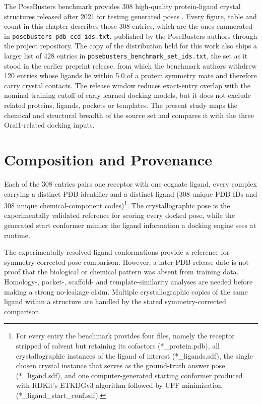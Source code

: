 The PoseBusters benchmark provides 308 high-quality protein-ligand crystal structures released after 2021 for testing generated poses \cite{ref035}. Every figure, table and count in this chapter describes those 308 entries, which are the ones enumerated in \texttt{posebusters\_pdb\_ccd\_ids.txt}, published by the PoseBusters authors through the project repository. The copy of the distribution held for this work also ships a larger list of 428 entries in \texttt{posebusters\_benchmark\_set\_ids.txt}, the set as it stood in the earlier preprint release, from which the benchmark authors withdrew 120 entries whose ligands lie within 5.0 \angstrom{} of a protein symmetry mate and therefore carry crystal contacts. The release window reduces exact-entry overlap with the nominal training cutoff of early learned docking models, but it does not exclude related proteins, ligands, pockets or templates. The present study maps the chemical and structural breadth of the source set and compares it with the three Orai1-related docking inputs.

\hypertarget{composition-and-provenance}{%
\section{Composition and Provenance}\label{composition-and-provenance}}

Each of the 308 entries pairs one receptor with one cognate ligand, every complex carrying a distinct PDB identifier and a distinct ligand (308 unique PDB IDs and 308 unique chemical-component codes)\footnote{For every entry the benchmark provides four files, namely the receptor stripped of solvent but retaining its cofactors (*\_protein.pdb), all crystallographic instances of the ligand of interest (*\_ligands.sdf), the single chosen crystal instance that serves as the ground-truth answer pose (*\_ligand.sdf), and one computer-generated starting conformer produced with RDKit's ETKDGv3 algorithm followed by UFF minimisation (*\_ligand\_start\_conf.sdf).}. The crystallographic pose is the experimentally validated reference for scoring every docked pose, while the generated start conformer mimics the ligand information a docking engine sees at runtime.

The experimentally resolved ligand conformations provide a reference for symmetry-corrected pose comparison. However, a later PDB release date is not proof that the biological or chemical pattern was absent from training data. Homology-, pocket-, scaffold- and template-similarity analyses are needed before making a strong no-leakage claim. Multiple crystallographic copies of the same ligand within a structure are handled by the stated symmetry-corrected comparison.

